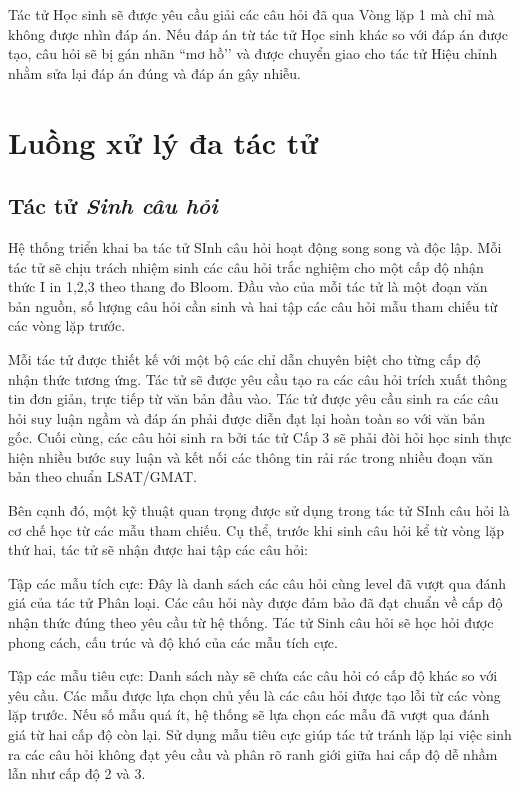  Tác tử {Học sinh} sẽ được yêu cầu giải các câu hỏi đã qua Vòng lặp 1 mà chỉ mà không được nhìn đáp án. Nếu đáp án từ tác tử {Học sinh} khác so với đáp án được tạo, câu hỏi sẽ bị gán nhãn ``mơ hồ’’ và được chuyển giao cho tác tử {Hiệu chỉnh} nhằm sửa lại đáp án đúng và đáp án gây nhiễu.

\section{Luồng xử lý đa tác tử}

\subsection{Tác tử \textit{Sinh câu hỏi}}
Hệ thống triển khai ba tác tử {SInh câu hỏi} hoạt động song song và độc lập. Mỗi tác tử sẽ chịu trách nhiệm sinh các câu hỏi trắc nghiệm cho một cấp độ nhận thức I in {1,2,3} theo thang đo Bloom. Đầu vào của mỗi tác tử là một đoạn văn bản nguồn, số lượng câu hỏi cần sinh và hai tập các câu hỏi mẫu tham chiếu từ các vòng lặp trước.

Mỗi tác tử được thiết kế với một bộ các chỉ dẫn chuyên biệt cho từng cấp độ nhận thức tương ứng. Tác tử  sẽ được yêu cầu tạo ra các câu hỏi trích xuất thông tin đơn giản, trực tiếp từ văn bản đầu vào. Tác tử  được yêu cầu sinh ra các câu hỏi suy luận ngầm và đáp án phải được diễn đạt lại hoàn toàn so với văn bản gốc. Cuối cùng, các câu hỏi sinh ra bởi tác tử {Cấp 3} sẽ phải đòi hỏi học sinh thực hiện nhiều bước suy luận và kết nối các thông tin rải rác trong nhiều đoạn văn bản theo chuẩn LSAT/GMAT.

Bên cạnh đó, một kỹ thuật quan trọng được sử dụng trong tác tử {SInh câu hỏi} là cơ chế học từ các mẫu tham chiếu. Cụ thể, trước khi sinh câu hỏi kể từ vòng lặp thứ hai, tác tử sẽ nhận được hai tập các câu hỏi:
\item {Tập các mẫu tích cực:} Đây là danh sách các câu hỏi cùng level đã vượt qua đánh giá của tác tử {Phân loại}. Các câu hỏi này được đảm bảo đã đạt chuẩn về cấp độ nhận thức đúng theo yêu cầu từ hệ thống. Tác tử {Sinh câu hỏi} sẽ học hỏi được phong cách, cấu trúc và độ khó của các mẫu tích cực.

\item {Tập các mẫu tiêu cực:} Danh sách này sẽ chứa các câu hỏi có cấp độ khác so với yêu cầu. Các mẫu được lựa chọn chủ yếu là các câu hỏi được tạo lỗi từ các vòng lặp trước. Nếu số mẫu quá ít, hệ thống sẽ lựa chọn các mẫu đã vượt qua đánh giá từ hai cấp độ còn lại. Sử dụng mẫu tiêu cực giúp tác tử tránh lặp lại việc sinh ra các câu hỏi không đạt yêu cầu và phân rõ ranh giới giữa hai cấp độ dễ nhầm lẫn như cấp độ 2 và 3.

